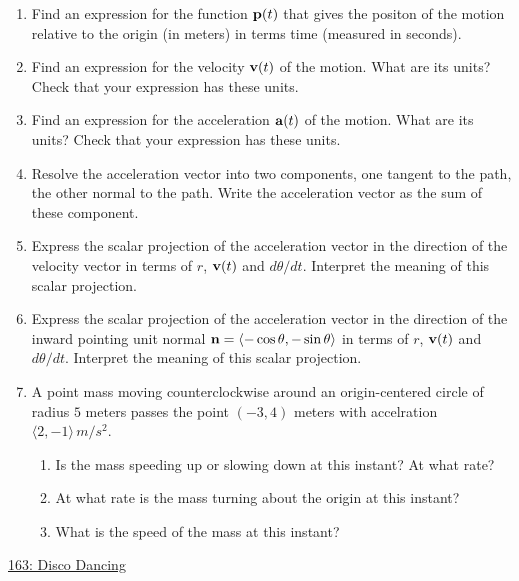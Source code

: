 \documentclass{ximera}
\begin{document}
\begin{enumerate}
\item Find an expression for the function ${\bf p}(t)$ that gives the positon of the motion relative to the origin (in meters) in terms time (measured in seconds).

\item Find an expression for the velocity ${\bf v}(t)$ of the motion. What are its units? Check that your expression has these units.

\item Find an expression for the acceleration ${\bf a}(t)$ of the motion. What are its units? Check that your expression has these units.

\item Resolve the acceleration vector into two components, one tangent to the path, the other normal to the path. Write the acceleration vector as the sum of these component.

\item Express the scalar projection of the acceleration vector in the direction of the velocity vector in terms of $r$, ${\bf v}(t)$ and $d\theta/dt$. Interpret the meaning of this scalar projection.

\item Express the scalar projection of the acceleration vector in the direction of the inward pointing unit normal ${\bf n} = \langle -\cos\theta, -\sin\theta \rangle$ in terms of $r$, ${\bf v}(t)$ and $d\theta/dt$. Interpret the meaning of this scalar projection.

\item A point mass moving counterclockwise around an origin-centered circle of radius $5$ meters passes the point $(-3,4)$ meters with accelration $\langle 2, -1\rangle \, m/s^2$.  

\begin{enumerate}
\item Is the mass speeding up or slowing down at this instant? At what rate?

\item At what rate is the mass turning about the origin at this instant?

\item What is the speed of the mass at this instant?
\end{enumerate}

\end{enumerate}


\begin{question}  \label{Q6756456443gg}

\begin{onlineOnly}
    \begin{center}
\end{center}
\end{onlineOnly}

\href{https://www.geogebra.org/classic/ssxun58x}{163: Disco Dancing}

\end{question}
\end{document}
